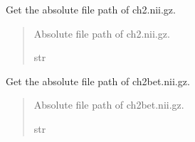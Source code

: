 \documentclass[letterpaper,10pt,english]{sphinxhowto}
\begin{document}

\begin{fulllineitems}
\label{\detokenize{stuff:neurora.stuff.get_bg_ch2}}
\pysigstartsignatures
{}
\pysigstopsignatures
\sphinxAtStartPar
Get the absolute file path of ch2.nii.gz.
\begin{quote}\begin{description}
\sphinxAtStartPar
{} \textendash{} Absolute file path of ch2.nii.gz.

\sphinxAtStartPar
str

\end{description}\end{quote}

\end{fulllineitems}


\begin{fulllineitems}
\label{\detokenize{stuff:neurora.stuff.get_bg_ch2bet}}
\pysigstartsignatures
{}
\pysigstopsignatures
\sphinxAtStartPar
Get the absolute file path of ch2bet.nii.gz.
\begin{quote}\begin{description}
\sphinxAtStartPar
{} \textendash{} Absolute file path of ch2bet.nii.gz.

\sphinxAtStartPar
str

\end{description}\end{quote}

\end{fulllineitems}

\end{document}
